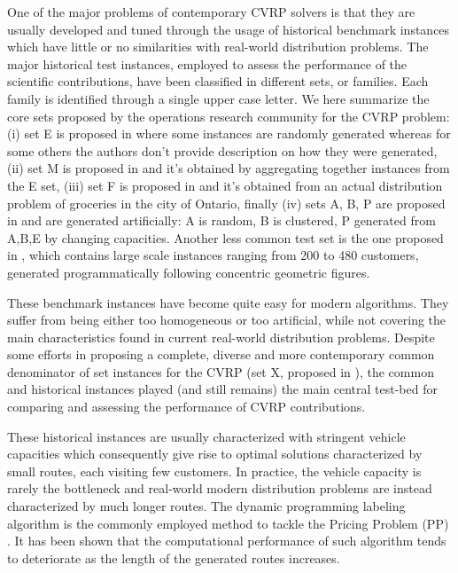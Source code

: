 One of the major problems of contemporary CVRP solvers
is that they are usually developed and tuned through the usage
of historical benchmark instances which
have little or no similarities with real-world distribution problems.
The major historical test instances,
employed to assess the performance of the scientific contributions,
have been classified in different sets, or families.
Each family is identified through a single upper case letter.
We here summarize the core sets proposed by the operations research community for the CVRP problem:
(i) set E is proposed in \textcite{dantzig1959, christofides1969, gaskell1967bases, gillett1974heuristic}
where some instances are randomly generated whereas for some others
the authors don't provide description on how they were generated,
(ii) set M is proposed in \textcite{christofides1979vehicle} and
it's obtained by aggregating together instances from the E set,
(iii) set F is proposed in \textcite{fisher1994} and it's obtained from an actual distribution problem of groceries in the city of Ontario,
finally (iv) sets A, B, P are proposed in \textcite{augerat1995} and are generated artificially: A is random, B is clustered, P generated from A,B,E by changing capacities.
Another less common test set is the one proposed in \textcite{golden1998impact},
which contains large scale instances ranging from 200 to 480 customers,
generated programmatically following concentric geometric figures.

These benchmark instances have become quite easy for modern algorithms.
They suffer from being either too homogeneous or too artificial,
while not covering the main characteristics found in current real-world distribution problems.
Despite some efforts in proposing a complete, diverse and more contemporary common denominator
of set instances for the CVRP (set X, proposed in \textcite{uchoa2017}),
the common and historical instances played (and still remains) the main central test-bed for comparing
and assessing the performance of CVRP contributions.

These historical instances are usually characterized with stringent vehicle capacities
which consequently give rise to optimal solutions characterized by small routes, each visiting few customers.
In practice, the vehicle capacity is rarely the bottleneck and
real-world modern distribution problems are instead characterized by much longer routes.
The dynamic programming labeling algorithm
\parencite{desrochers1992,feillet2004}
is the commonly employed method to tackle the Pricing Problem (PP) \parencite{gutierrez-jarpa2010, archetti2011, bettinelli2011, contardo2014, contardo2015, pecin2017new, pecin2017improved, pessoa2020generic}.
It has been shown that the computational performance of such algorithm
tends to deteriorate as the length of the generated routes increases.

